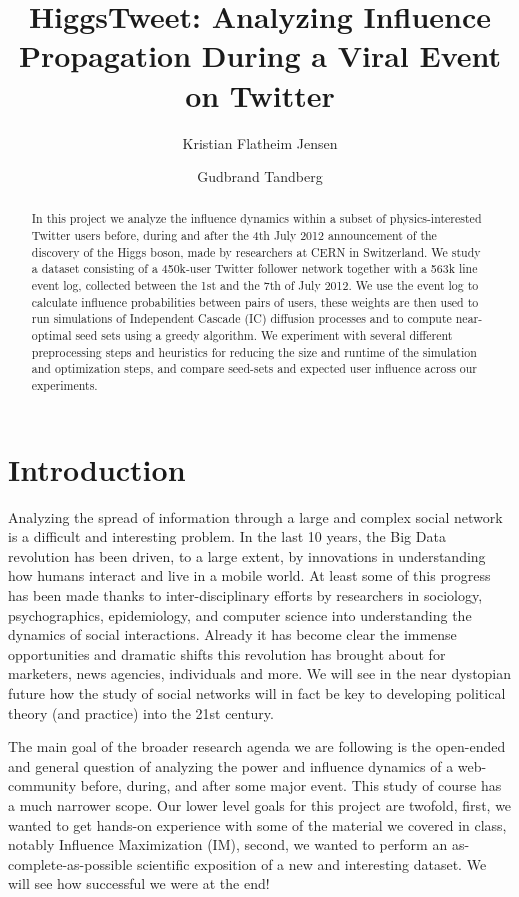 \documentclass[sigconf]{acmart}
\title{HiggsTweet: Analyzing Influence Propagation During a Viral Event on Twitter}
\author{Kristian Flatheim Jensen}
\affiliation{%
\institution{Norwegian University of Science and Technology}
}
\author{Gudbrand Tandberg}
\affiliation{%
\institution{The University of British Colombia}
}
\begin{document}
\maketitle

\begin{abstract}
In this project we analyze the influence dynamics within a subset of physics-interested Twitter users before, during and after the 4th July 2012 announcement of the discovery of the Higgs boson, made by researchers at CERN in Switzerland. We study a dataset consisting of a 450k-user Twitter follower network together with a 563k line event log, collected between the 1st and the 7th of July 2012. We use the event log to calculate influence probabilities between pairs of users, these weights are then used to run simulations of Independent Cascade (IC) diffusion processes and to compute near-optimal seed sets using a greedy algorithm. We experiment with several different preprocessing steps and heuristics for reducing the size and runtime of the simulation and optimization steps, and compare seed-sets and expected user influence across our experiments. 
\end{abstract}

\section{Introduction}

Analyzing the spread of information through a large and complex social network is a difficult and interesting problem. In the last 10 years, the Big Data revolution has been driven, to a large extent, by innovations in understanding how humans interact and live in a mobile world. At least some of this progress has been made thanks to inter-disciplinary efforts by researchers in sociology, psychographics, epidemiology, and computer science into understanding the dynamics of social interactions. Already it has become clear the immense opportunities and dramatic shifts this revolution has brought about for marketers, news agencies, individuals and more. We will see in the near dystopian future how the study of social networks will in fact be key to developing political theory (and practice) into the 21st century.

The main goal of the broader research agenda we are following is the open-ended and general question of analyzing the power and influence dynamics of a web-community before, during, and after some major event. This study of course has a much narrower scope. Our lower level goals for this project are twofold, first, we wanted to get hands-on experience with some of the material we covered in class, notably Influence Maximization (IM), second, we wanted to perform an as-complete-as-possible scientific exposition of a new and interesting dataset. We will see how successful we were at the end!
\end{document}
